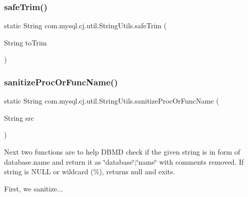 \mbox{\label{classcom_1_1mysql_1_1cj_1_1util_1_1_string_utils_a5396da0d2136d1d4c29ac524fb3c4a95}} 
\subsubsection{\texorpdfstring{safe\+Trim()}{safeTrim()}}
{\footnotesize\ttfamily static String com.\+mysql.\+cj.\+util.\+String\+Utils.\+safe\+Trim (\begin{DoxyParamCaption}\item[{String}]{to\+Trim }\end{DoxyParamCaption})\hspace{0.3cm}{\ttfamily [static]}}

\mbox{\label{classcom_1_1mysql_1_1cj_1_1util_1_1_string_utils_a465f0e5c11f81ab8aab8913e9a3f4e4d}} 
\subsubsection{\texorpdfstring{sanitize\+Proc\+Or\+Func\+Name()}{sanitizeProcOrFuncName()}}
{\footnotesize\ttfamily static String com.\+mysql.\+cj.\+util.\+String\+Utils.\+sanitize\+Proc\+Or\+Func\+Name (\begin{DoxyParamCaption}\item[{String}]{src }\end{DoxyParamCaption})\hspace{0.3cm}{\ttfamily [static]}}

Next two functions are to help D\+B\+MD check if the given string is in form of database.\+name and return it as \char`\"{}database\char`\"{};\char`\"{}name\char`\"{} with comments removed. If string is N\+U\+LL or wildcard (\%), returns null and exits.

First, we sanitize...


